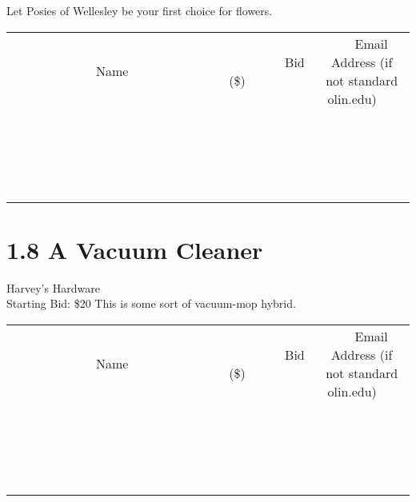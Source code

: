 \documentclass[11pt]{article}
\begin{document}
Let Posies of Wellesley be your first choice for flowers.
\\[3ex]
\begin{tabular}{c c c}
~~~~~~~~~~~~~Name~~~~~~~~~~~~~ & ~~~~~~~~~Bid (\$)~~~~~~~~~  & ~~~Email Address (if not standard olin.edu)~~~\\
 & & \\
\hline
 & & \\
\hline
 & & \\
\hline
 & & \\
\hline
 & & \\
\hline
 & & \\
\hline
 & & \\
\hline
 & & \\
\hline
 & & \\
\hline
 & & \\
\hline
 & & \\
\hline
 & & \\
\hline
 & & \\
\hline
 & & \\
\hline
 & & \\
\hline
 & & \\
\hline
 & & \\
\hline
 & & \\
\hline
 & & \\
\hline
\end{tabular}
\newpage
\section*{1.8 A Vacuum Cleaner}
Harvey's Hardware
\\
Starting Bid: \$20
\newline
This is some sort of vacuum-mop hybrid.
\\[3ex]
\begin{tabular}{c c c}
~~~~~~~~~~~~~Name~~~~~~~~~~~~~ & ~~~~~~~~~Bid (\$)~~~~~~~~~  & ~~~Email Address (if not standard olin.edu)~~~\\
 & & \\
\hline
 & & \\
\hline
 & & \\
\hline
 & & \\
\hline
 & & \\
\hline
 & & \\
\hline
 & & \\
\hline
 & & \\
\hline
 & & \\
\hline
 & & \\
\hline
 & & \\
\hline
 & & \\
\hline
 & & \\
\hline
 & & \\
\hline
 & & \\
\hline
 & & \\
\hline
 & & \\
\hline
 & & \\
\hline
 & & \\
\hline
\end{tabular}
\newpage
\end{document}
